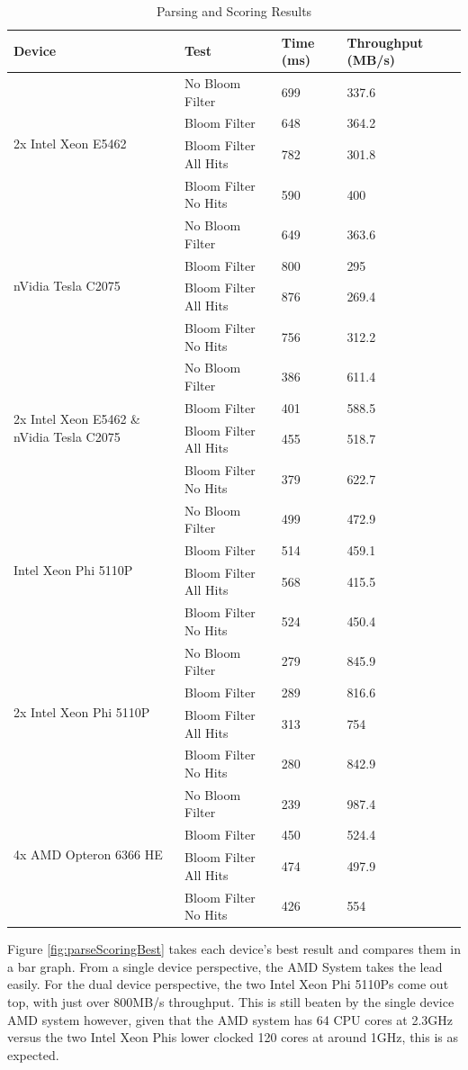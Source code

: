 \begin{table}[H]
\begin{tabular}{|l|l|l|l|}
\hline
Device & Test & Time (ms) & Throughput (MB/s)\\
\hline
\multirow{4}{*}{2x Intel Xeon E5462}
& No Bloom Filter & 699 & 337.6 \\
& Bloom Filter & 648 & 364.2 \\
& Bloom Filter All Hits & 782 & 301.8 \\
& Bloom Filter No Hits & 590 & 400 \\
\hline
\multirow{4}{*}{nVidia Tesla C2075}
& No Bloom Filter & 649 & 363.6 \\
& Bloom Filter & 800 & 295 \\
& Bloom Filter All Hits & 876 & 269.4 \\
& Bloom Filter No Hits & 756 & 312.2 \\
\hline
\multirow{4}{*}{2x Intel Xeon E5462 \& nVidia Tesla C2075}
& No Bloom Filter & 386 & 611.4 \\
& Bloom Filter & 401 & 588.5 \\
& Bloom Filter All Hits & 455 & 518.7 \\
& Bloom Filter No Hits & 379 & 622.7 \\
\hline
\multirow{4}{*}{Intel Xeon Phi 5110P}
& No Bloom Filter & 499 & 472.9 \\
& Bloom Filter & 514 & 459.1 \\
& Bloom Filter All Hits & 568 & 415.5 \\
& Bloom Filter No Hits & 524 & 450.4 \\
\hline
\multirow{4}{*}{2x Intel Xeon Phi 5110P}
& No Bloom Filter & 279 & 845.9 \\
& Bloom Filter & 289 & 816.6 \\
& Bloom Filter All Hits & 313 & 754 \\
& Bloom Filter No Hits & 280 & 842.9 \\
\hline
\multirow{4}{*}{4x AMD Opteron 6366 HE}
& No Bloom Filter & 239 & 987.4 \\
& Bloom Filter & 450 & 524.4 \\
& Bloom Filter All Hits & 474 & 497.9 \\
& Bloom Filter No Hits & 426 & 554 \\
\hline
\end{tabular}
\caption{Parsing and Scoring Results}
\label{table:parsingScoring}
\end{table}

Figure \ref{fig:parseScoringBest} takes each device's best result and compares
them in a bar graph. From a single device perspective, the AMD System takes the
lead easily. For the dual device perspective, the two Intel Xeon Phi 5110Ps come
out top, with just over 800MB/s throughput. This is still beaten by the single
device AMD system however, given that the AMD system has 64 CPU cores at 2.3GHz
versus the two Intel Xeon Phis lower clocked 120 cores at around 1GHz, this is
as expected.

